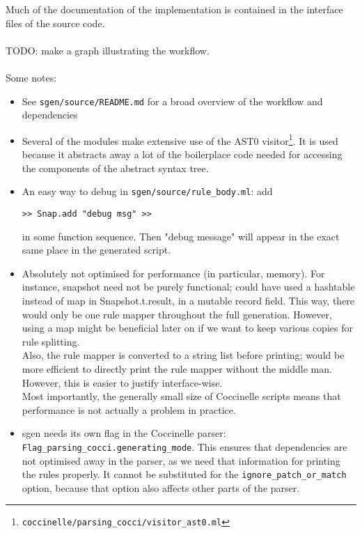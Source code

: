 Much of the documentation of the implementation is contained in the interface files of the source code.\\\\
TODO: make a graph illustrating the workflow.\\\\
Some notes:
\begin{itemize}
\item See \texttt{sgen/source/README.md} for a broad overview of the workflow and dependencies
\item Several of the modules make extensive use of the AST0 visitor\footnote{\texttt{coccinelle/parsing\_cocci/visitor\_ast0.ml}}. It is used because it abstracts away a lot of the boilerplace code needed for accessing the components of the abstract syntax tree.
\item An easy way to debug in \texttt{sgen/source/rule\_body.ml}: add
\begin{verbatim}
>> Snap.add "debug msg" >>
\end{verbatim}
in some function sequence. Then "debug message" will appear in the exact same place in the generated script.
\item Absolutely not optimised for performance (in particular, memory). For instance, snapshot need not be purely functional; could have used a hashtable instead of map in Snapshot.t.result, in a mutable record field. This way, there would only be one rule mapper throughout the full generation. However, using a map might be beneficial later on if we want to keep various copies for rule splitting.\\
Also, the rule mapper is converted to a string list before printing; would be more efficient to directly print the rule mapper without the middle man. However, this is easier to justify interface-wise. \\
Most importantly, the generally small size of Coccinelle scripts means that performance is not actually a problem in practice.
\item sgen needs its own flag in the Coccinelle parser: \texttt{Flag\_parsing\_cocci.generating\_mode}. This ensures that dependencies are not optimised away in the parser, as we need that information for printing the rules properly. It cannot be substituted for the \texttt{ignore\_patch\_or\_match} option, because that option also affects other parts of the parser.
\end{itemize}





